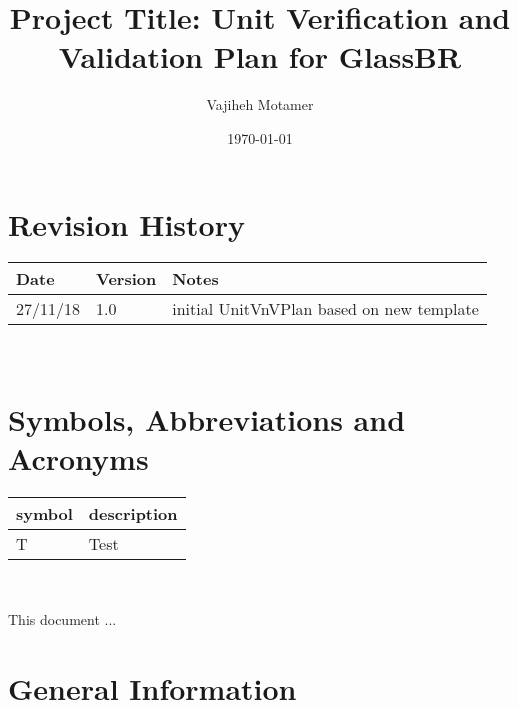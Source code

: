 \documentclass[12pt]{article}
\newcommand{\progname}{GlassBR}
\begin{document}
\title{Project Title: Unit Verification and Validation Plan for \progname{}} 
\author{Vajiheh Motamer}
\date{\today}
	
\maketitle


\section{Revision History}

\begin{tabularx}{\textwidth}{p{3cm}p{2cm}X}
\toprule {\bf Date} & {\bf Version} & {\bf Notes}\\
\midrule
27/11/18 & 1.0 & initial UnitVnVPlan based on new template\\

\bottomrule
\end{tabularx}

~\newpage

\tableofcontents

\listoftables


\listoffigures


\newpage

\section{Symbols, Abbreviations and Acronyms}

\renewcommand{\arraystretch}{1.2}
\begin{tabular}{l l} 
  \toprule		
  \textbf{symbol} & \textbf{description}\\
  \midrule 
  T & Test\\
  \bottomrule
\end{tabular}\\


\newpage


This document ... 

\section{General Information}
\end{document}
